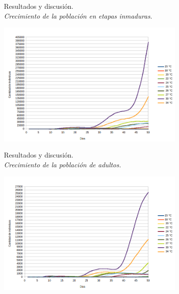 
\begin{frame}[t]{Resultados y discusión.\\\textit{Crecimiento de la población en etapas inmaduras.}}
\begin{center}
    \includegraphics[width=9.3cm]{../paper/graphics/evolucion-poblacion-all.png}
\end{center}
\end{frame}

\begin{frame}[t]{Resultados y discusión.\\\textit{Crecimiento de la población de adultos.}}
\begin{center}
    \includegraphics[width=9.3cm]{../paper/graphics/evolucion-poblacion-adultos.png}
\end{center}
\end{frame}


